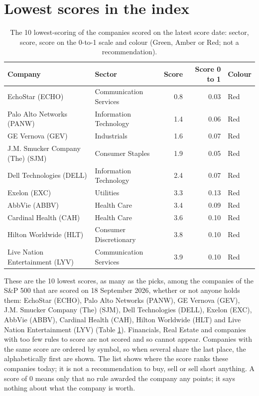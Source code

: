 \documentclass[11pt,a4paper]{article}
\begin{document}
\section{Lowest scores in the index}
\label{sec:worst}
\begin{table}[H]
\centering
\small
\caption{The 10 lowest-scoring of the companies scored on the latest score date: sector, score, score on the 0-to-1 scale and colour (Green, Amber or Red; not a recommendation).}\label{tab:worst}
\begin{tabular}{p{4.4cm} p{3cm} r r p{3cm}}
\hline
Company & Sector & Score & Score 0 to 1 & Colour \\
\hline
EchoStar (ECHO) & Communication Services & 0.8 & 0.03 & \cellcolor[HTML]{F4B6B6}Red \\
Palo Alto Networks (PANW) & Information Technology & 1.4 & 0.06 & \cellcolor[HTML]{F4B6B6}Red \\
GE Vernova (GEV) & Industrials & 1.6 & 0.07 & \cellcolor[HTML]{F4B6B6}Red \\
J.M. Smucker Company (The) (SJM) & Consumer Staples & 1.9 & 0.05 & \cellcolor[HTML]{F4B6B6}Red \\
Dell Technologies (DELL) & Information Technology & 2.4 & 0.07 & \cellcolor[HTML]{F4B6B6}Red \\
Exelon (EXC) & Utilities & 3.3 & 0.13 & \cellcolor[HTML]{F4B6B6}Red \\
AbbVie (ABBV) & Health Care & 3.4 & 0.09 & \cellcolor[HTML]{F4B6B6}Red \\
Cardinal Health (CAH) & Health Care & 3.6 & 0.10 & \cellcolor[HTML]{F4B6B6}Red \\
Hilton Worldwide (HLT) & Consumer Discretionary & 3.8 & 0.10 & \cellcolor[HTML]{F4B6B6}Red \\
Live Nation Entertainment (LYV) & Communication Services & 3.9 & 0.10 & \cellcolor[HTML]{F4B6B6}Red \\
\hline
\end{tabular}
\end{table}
These are the 10 lowest scores, as many as the picks, among the companies of the S\&P 500 that are scored on 18 September 2026, whether or not anyone holds them: EchoStar (ECHO), Palo Alto Networks (PANW), GE Vernova (GEV), J.M. Smucker Company (The) (SJM), Dell Technologies (DELL), Exelon (EXC), AbbVie (ABBV), Cardinal Health (CAH), Hilton Worldwide (HLT) and Live Nation Entertainment (LYV) (Table \ref{tab:worst}). Financials, Real Estate and companies with too few rules to score are not scored and so cannot appear. Companies with the same score are ordered by symbol, so when several share the last place, the alphabetically first are shown. The list shows where the score ranks these companies today; it is not a recommendation to buy, sell or sell short anything. A score of 0 means only that no rule awarded the company any points; it says nothing about what the company is worth.
\end{document}
